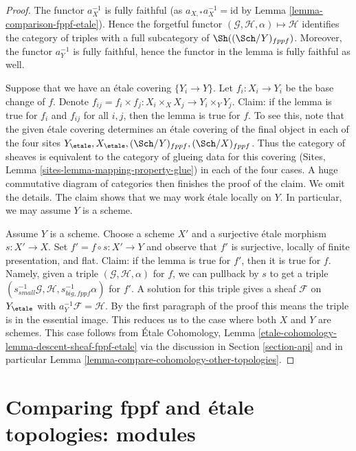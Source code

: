 \begin{proof}
The functor $a_X^{-1}$ is fully faithful (as $a_{X, *}a_X^{-1} = \text{id}$ by
Lemma \ref{lemma-comparison-fppf-etale}). Hence the forgetful functor
$(\mathcal{G}, \mathcal{H}, \alpha) \mapsto \mathcal{H}$ identifies the
category of triples with a full subcategory of $\Sh((\Sch/Y)_{fppf})$.
Moreover, the functor $a_Y^{-1}$ is fully faithful, hence the functor
in the lemma is fully faithful as well.

\medskip\noindent
Suppose that we have an \'etale covering $\{Y_i \to Y\}$.
Let $f_i : X_i \to Y_i$ be the base change of $f$.
Denote $f_{ij} = f_i \times f_j : X_i \times_X X_j  \to Y_i \times_Y Y_j$.
Claim: if the lemma is true for $f_i$ and $f_{ij}$ for all $i, j$, then
the lemma is true for $f$. To see this, note that the given \'etale covering
determines an \'etale covering of the final object in each of
the four sites $Y_\etale, X_\etale, (\Sch/Y)_{fppf}, (\Sch/X)_{fppf}$.
Thus the category of sheaves is equivalent to the category of
glueing data for this covering
(Sites, Lemma \ref{sites-lemma-mapping-property-glue})
in each of the four cases. A huge commutative diagram of
categories then finishes the proof of the claim. We omit the details.
The claim shows that we may work \'etale locally on $Y$.
In particular, we may assume $Y$ is a scheme.

\medskip\noindent
Assume $Y$ is a scheme. Choose a scheme $X'$ and a surjective \'etale
morphism $s : X' \to X$. Set $f' = f \circ s : X' \to Y$ and observe
that $f'$ is surjective, locally of finite presentation, and flat.
Claim: if the lemma is true for $f'$, then it is true for $f$.
Namely, given a triple $(\mathcal{G}, \mathcal{H}, \alpha)$
for $f$, we can pullback by $s$ to get a triple
$(s_{small}^{-1}\mathcal{G}, \mathcal{H}, s_{big, fppf}^{-1}\alpha)$
for $f'$. A solution for this triple gives a sheaf
$\mathcal{F}$ on $Y_\etale$ with $a_Y^{-1}\mathcal{F} = \mathcal{H}$.
By the first paragraph of the proof this means the triple is
in the essential image. This reduces us to the case
where both $X$ and $Y$ are schemes. This case follows from
\'Etale Cohomology, Lemma
\ref{etale-cohomology-lemma-descent-sheaf-fppf-etale}
via the discussion in Section \ref{section-api}
and in particular Lemma \ref{lemma-compare-cohomology-other-topologies}.
\end{proof}



\section{Comparing fppf and \'etale topologies: modules}
\label{section-fppf-etale-modules}

